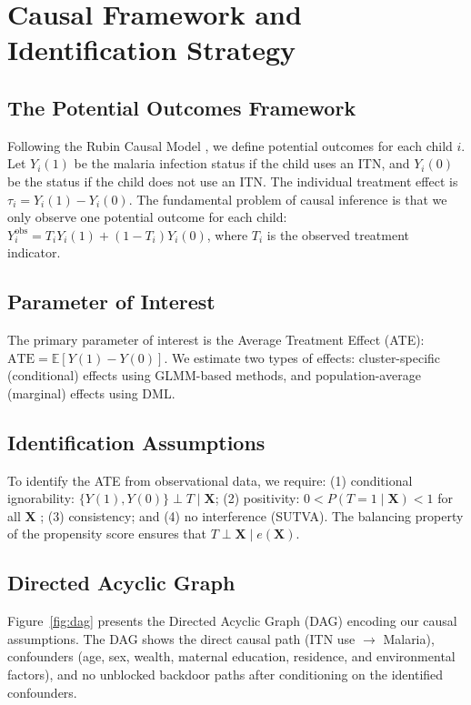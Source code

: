 \section{Causal Framework and Identification Strategy}

\subsection{The Potential Outcomes Framework}

Following the Rubin Causal Model \citep{rubin1974estimating}, we define potential outcomes for each child $i$. Let $Y_i(1)$ be the malaria infection status if the child uses an ITN, and $Y_i(0)$ be the status if the child does not use an ITN. The individual treatment effect is $\tau_i = Y_i(1) - Y_i(0)$. The fundamental problem of causal inference is that we only observe one potential outcome for each child: $Y_i^{\text{obs}} = T_i Y_i(1) + (1 - T_i) Y_i(0)$, where $T_i$ is the observed treatment indicator.

\subsection{Parameter of Interest}

The primary parameter of interest is the Average Treatment Effect (ATE): $\text{ATE} = \mathbb{E}[Y(1) - Y(0)]$. We estimate two types of effects: cluster-specific (conditional) effects using GLMM-based methods, and population-average (marginal) effects using DML.

\subsection{Identification Assumptions}

To identify the ATE from observational data, we require: (1) conditional ignorability: $\{Y(1), Y(0)\} \perp T \mid \mathbf{X}$; (2) positivity: $0 < P(T = 1 \mid \mathbf{X}) < 1$ for all $\mathbf{X}$ \citep{westreich2010invited}; (3) consistency; and (4) no interference (SUTVA). The balancing property of the propensity score \citep{rosenbaum1983central} ensures that $T \perp \mathbf{X} \mid e(\mathbf{X})$.

\subsection{Directed Acyclic Graph}

Figure~\ref{fig:dag} presents the Directed Acyclic Graph (DAG) encoding our causal assumptions. The DAG shows the direct causal path (ITN use $\rightarrow$ Malaria), confounders (age, sex, wealth, maternal education, residence, and environmental factors), and no unblocked backdoor paths after conditioning on the identified confounders.

